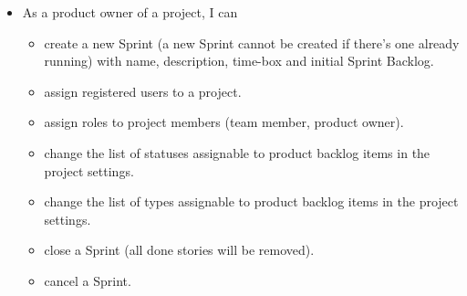 \documentclass[
	accentcolor=tud1a %
]{tudreport}
\begin{document}
{\begin{itemize}
	\item As a product owner of a project, I can
	\begin{itemize}
		\item create a new Sprint (a new Sprint cannot be created if there's one already running) with name, description, time-box and initial Sprint Backlog.
		\item assign registered users to a project.
		\item assign roles to project members (team member, product owner).
		\item change the list of statuses assignable to product backlog items in the project settings.
		\item change the list of types assignable to product backlog items in the project settings.
		\item close a Sprint (all done stories will be removed).
		\item cancel a Sprint.
	\end{itemize}
\end{itemize}
}

\printbibliography
\end{document}
